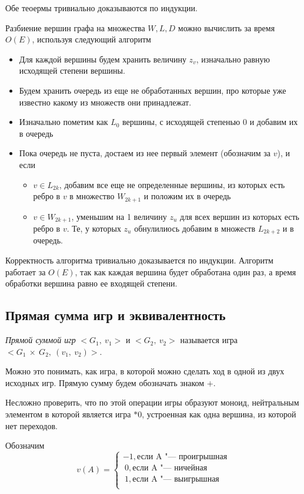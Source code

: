 \documentclass[12pt,a4paper]{article}
\theoremstyle{plain}
\newcommand{\nim}[1]{*#1}
\begin{document}
Обе теоермы тривиально доказываются по индукции.

Разбиение вершин графа на множества $W, L, D$ можно вычислить за время $O(E)$, используя следующий алгоритм
\begin{itemize}
\item Для каждой вершины будем хранить величину $z_v$, изначально равную исходящей степени вершины.
\item Будем хранить очередь из еще не обработанных вершин, про которые уже известно какому из множеств они принадлежат.
\item Изначально пометим как $L_0$ вершины, с исходящей степенью 0 и добавим их в очередь
\item Пока очередь не пуста, достаем из нее первый элемент (обозначим за $v$), и если 
\begin{itemize}
    \item $v \in L_{2k}$, добавим все еще не определенные вершины, из которых есть ребро в $v$ в множество $W_{2k+1}$ и положим их в очередь
    \item $v \in W_{2k+1}$, уменьшим на 1 величину $z_u$ для всех вершин из которых есть ребро в $v$. Те, у которых $z_u$ обнулилиось добавим в множеств $L_{2k+2}$ и в очередь.
\end{itemize}
\end{itemize}

Корректность алгоритма тривиально доказывается по индукции. Алгоритм работает за $O(E)$, так как каждая вершина будет обработана один раз,
а время обработки вершина равно ее входящей степени.

\subsection{Прямая сумма игр и эквивалентность}

\emph{Прямой суммой игр} $<G_1,~v_1>$ и $<G_2,~v_2>$ называется игра $<G_1~\times~G_2,~(v_1,~v_2)>$.

Можно это понимать, как игра, в которой можно сделать ход в одной из двух исходных игр.
Прямую сумму будем обозначать знаком $+$.

Несложно проверить, что по этой операции игры образуют моноид, нейтральным элементом в которой является игра
$\nim{0}$, устроенная как одна вершина, из которой нет переходов.

Обозначим 
$$
v(A) = \begin{cases}
-1, \text{если A "--- проигрышная} \\
~0, \text{если A "--- ничейная} \\
~1, \text{если A "--- выигрышная}\\
\end{cases}
$$
\end{document}
